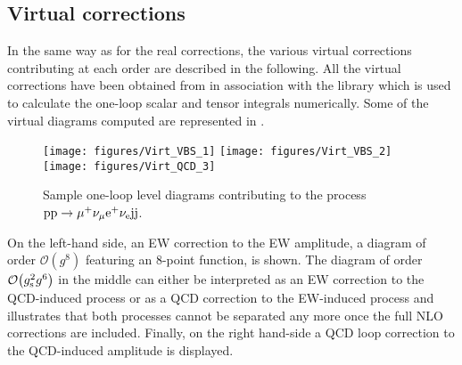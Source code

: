 \documentclass[a4article,11pt]{article}
\begin{document}
\subsection{Virtual corrections}
\label{ssec:VirtualCorrections}

In the same way as for the real corrections, the various virtual
corrections contributing at each order are described in the
following.  All the virtual corrections have been obtained from
\recola in association with the \collier library which is used to
calculate the one-loop scalar
\cite{tHooft:1978jhc,Beenakker:1988jr,Dittmaier:2003bc,Denner:2010tr}
and tensor integrals
\cite{Passarino:1978jh,Denner:2002ii,Denner:2005nn} numerically.  Some
of the virtual diagrams computed are represented in .
%
\begin{figure}
\begin{center}
          \texttt{[image: figures/Virt\_VBS\_1]}
          \texttt{[image: figures/Virt\_VBS\_2]}
          \texttt{[image: figures/Virt\_QCD\_3]}
\end{center}
        \caption{Sample one-loop level diagrams contributing to the process $\text{p}\text{p}\to\mu^+\nu_\mu\text{e}^+\nu_{\text{e}}\text{j}\text{j}$.}
\label{diag:NLO}
\end{figure}
%
On the left-hand side, an EW correction to the EW amplitude, a
diagram of order $\mathcal{O}{\left(g^{8}\right)}$ featuring an
8-point function, is shown.
The diagram of order $\mathcal{O}{\left(g_{\rm s}^{2}g^{6}\right)}$ in the middle can either be interpreted as
an EW correction to the QCD-induced process or as a QCD correction to
the EW-induced process and illustrates that both processes cannot be 
separated any more once the full NLO corrections are included.
Finally, on the right hand-side a QCD loop correction to the QCD-induced
amplitude is displayed.
\end{document}
